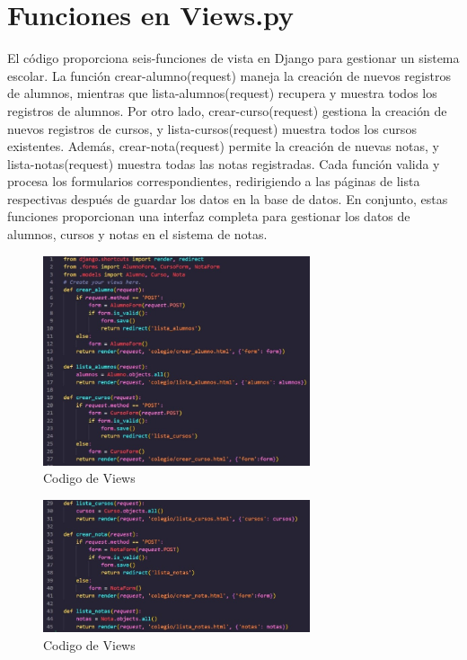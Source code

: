 \documentclass[10pt, a4paper]{article}
\begin{document}
\section{Funciones en Views.py}
El código proporciona seis-funciones de vista en Django para gestionar un sistema escolar. La función crear-alumno(request) maneja la creación de nuevos registros de alumnos, mientras que lista-alumnos(request) recupera y muestra todos los registros de alumnos. Por otro lado, crear-curso(request) gestiona la creación de nuevos registros de cursos, y lista-cursos(request) muestra todos los cursos existentes. Además, crear-nota(request) permite la creación de nuevas notas, y lista-notas(request) muestra todas las notas registradas. Cada función valida y procesa los formularios correspondientes, redirigiendo a las páginas de lista respectivas después de guardar los datos en la base de datos. En conjunto, estas funciones proporcionan una interfaz completa para gestionar los datos de alumnos, cursos y notas en el sistema de notas.
\begin{figure}[H]
  \centering
  \includegraphics[width=0.7\textwidth]{img/imagen2.jpeg}
  \caption{Codigo de Views}
\end{figure} 

\begin{figure}[H]
  \centering
  \includegraphics[width=0.7\textwidth]{img/imagen3.jpeg}
  \caption{Codigo de Views}
\end{figure} 
\end{document}
